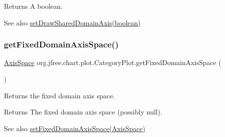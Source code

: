 \begin{DoxyReturn}{Returns}
A boolean.
\end{DoxyReturn}
\begin{DoxySeeAlso}{See also}
\mbox{\hyperlink{classorg_1_1jfree_1_1chart_1_1plot_1_1_category_plot_ac261da7da2048f2b53f78ef996dfc2c5}{set\+Draw\+Shared\+Domain\+Axis(boolean)}} 
\end{DoxySeeAlso}
\mbox{\label{classorg_1_1jfree_1_1chart_1_1plot_1_1_category_plot_aae0ace36bbd4bc7545ff2d8fe2b7cc82}} 
\subsubsection{\texorpdfstring{get\+Fixed\+Domain\+Axis\+Space()}{getFixedDomainAxisSpace()}}
{\footnotesize\ttfamily \mbox{\hyperlink{classorg_1_1jfree_1_1chart_1_1axis_1_1_axis_space}{Axis\+Space}} org.\+jfree.\+chart.\+plot.\+Category\+Plot.\+get\+Fixed\+Domain\+Axis\+Space (\begin{DoxyParamCaption}{ }\end{DoxyParamCaption})}

Returns the fixed domain axis space.

\begin{DoxyReturn}{Returns}
The fixed domain axis space (possibly {\ttfamily null}).
\end{DoxyReturn}
\begin{DoxySeeAlso}{See also}
\mbox{\hyperlink{classorg_1_1jfree_1_1chart_1_1plot_1_1_category_plot_aefb6291a621dc2a80b97ae40ae020cf9}{set\+Fixed\+Domain\+Axis\+Space(\+Axis\+Space)}} 
\end{DoxySeeAlso}
\mbox{\label{classorg_1_1jfree_1_1chart_1_1plot_1_1_category_plot_a46c3a569343408d1e941b99d9659b04d}} 

